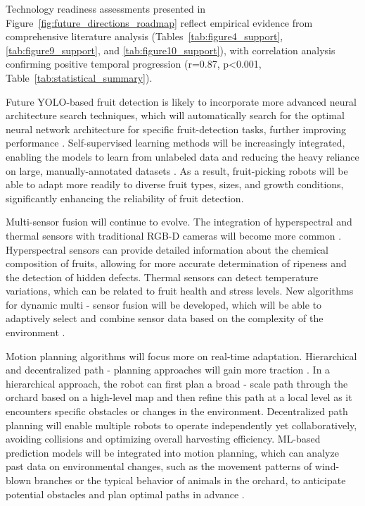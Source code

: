 \documentclass{ieeeaccess}
\begin{document}
Technology readiness assessments presented in Figure~\ref{fig:future_directions_roadmap} reflect empirical evidence from comprehensive literature analysis (Tables~\ref{tab:figure4_support}, \ref{tab:figure9_support}, and \ref{tab:figure10_support}), with correlation analysis confirming positive temporal progression (r=0.87, p<0.001, Table~\ref{tab:statistical_summary}).

Future YOLO-based fruit detection is likely to incorporate more advanced neural architecture search techniques, which will automatically search for the optimal neural network architecture for specific fruit-detection tasks, further improving performance \cite{hou2023overview, suresh2023selective}. Self-supervised learning methods will be increasingly integrated, enabling the models to learn from unlabeled data and reducing the heavy reliance on large, manually-annotated datasets \cite{suresh2023selective, zhang2024automatic}. As a result, fruit-picking robots will be able to adapt more readily to diverse fruit types, sizes, and growth conditions, significantly enhancing the reliability of fruit detection.

Multi-sensor fusion will continue to evolve. The integration of hyperspectral and thermal sensors with traditional RGB-D cameras will become more common \cite{mohamed2021smart, martos2021ensuring}. Hyperspectral sensors can provide detailed information about the chemical composition of fruits, allowing for more accurate determination of ripeness and the detection of hidden defects. Thermal sensors can detect temperature variations, which can be related to fruit health and stress levels. New algorithms for dynamic multi - sensor fusion will be developed, which will be able to adaptively select and combine sensor data based on the complexity of the environment \cite{liu2024hierarchical}.

Motion planning algorithms will focus more on real-time adaptation. Hierarchical and decentralized path - planning approaches will gain more traction \cite{lytridis2021overview, li2023multi}. In a hierarchical approach, the robot can first plan a broad - scale path through the orchard based on a high-level map and then refine this path at a local level as it encounters specific obstacles or changes in the environment. Decentralized path planning will enable multiple robots to operate independently yet collaboratively, avoiding collisions and optimizing overall harvesting efficiency. ML-based prediction models will be integrated into motion planning, which can analyze past data on environmental changes, such as the movement patterns of wind-blown branches or the typical behavior of animals in the orchard, to anticipate potential obstacles and plan optimal paths in advance \cite{rajendran2024towards}.
\end{document}
